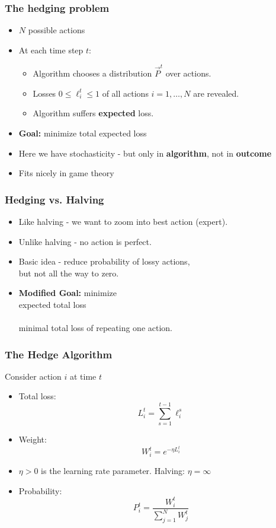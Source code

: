 \documentclass[handout]{beamer}
\begin{document}
\begin{frame}
\frametitle{The hedging problem}

\begin{itemize}
\item $N$ possible actions 

\item At each time step $t$:
\begin{itemize}
\item Algorithm chooses a distribution $\vec{P}^t$ over actions.
\item Losses $0 \leq \ell_i^t \leq 1$ of all actions $i=1,\ldots,N$ are revealed.
\item Algorithm suffers {\bf expected} loss.
\end{itemize}
\item {{\bf Goal:} minimize total expected loss}
\item {Here we have stochasticity - but only in {\bf algorithm}, not in {\bf outcome}}
\item {Fits nicely in game theory}
\end{itemize}
\end{frame}

\begin{frame}
\frametitle{Hedging vs. Halving}
\begin{itemize}
\item Like halving - we want to zoom into best action (expert).
\item Unlike halving - no action is perfect.
\item Basic idea - reduce probability of lossy actions, \\
but {\color{red}not all the way to zero}.
\item {\bf Modified Goal:}
minimize {\color{red}{difference between}} \\
expected total loss \\
{\color{red}{and}} \\
minimal total loss of repeating one action.
\end{itemize}
\end{frame}

\begin{frame}
\frametitle{The Hedge Algorithm}
Consider action $i$ at time $t$
\begin{itemize}
\item Total loss:
$$L_i^t = \sum_{s=1}^{t-1} \ell_i^s$$
\item Weight:
$$W_i^t = e^{-\eta L_i^t}$$
\item
$\eta>0$ is the learning rate parameter. Halving: $\eta=\infty$ 
\item Probability:
$$P_i^t = \frac{W_i^t}{\sum_{j=1}^N W_j^t} $$
\end{itemize}
\end{frame}
\end{document}
